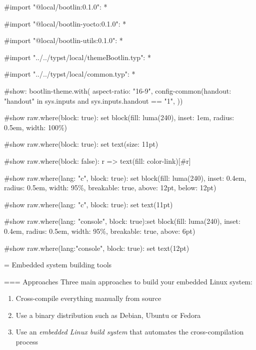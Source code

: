 #import "@local/bootlin:0.1.0": *

#import "@local/bootlin-yocto:0.1.0": *

#import "@local/bootlin-utils:0.1.0": *

#import "../../typst/local/themeBootlin.typ": *

#import "../../typst/local/common.typ": *

#show: bootlin-theme.with( aspect-ratio: "16-9", config-common(handout: "handout" in sys.inputs and sys.inputs.handout == "1", ))

#show raw.where(block: true): set block(fill: luma(240), inset: 1em, radius: 0.5em, width: 100\%)

#show raw.where(block: true): set text(size: 11pt)

#show raw.where(block: false): r => text(fill: color-link)[#r]

#show raw.where(lang: "c", block: true): set block(fill: luma(240), inset: 0.4em, radius: 0.5em, width: 95\%, breakable: true, above: 12pt, below: 12pt)

#show raw.where(lang: "c", block: true): set text(11pt)

#show raw.where(lang: "console", block: true):set block(fill: luma(240), inset: 0.4em, radius: 0.5em, width: 95\%, breakable: true, above: 6pt)

#show raw.where(lang:"console", block: true): set text(12pt)

 = Embedded system building tools

=== {Approaches}
  Three main approaches to build your embedded Linux system:
  \begin{enumerate}
  \item Cross-compile everything manually from source
  \item Use a binary distribution such as Debian, Ubuntu or Fedora
  \item Use an {\em embedded Linux build system} that automates the
    cross-compilation process
  \end{enumerate}



